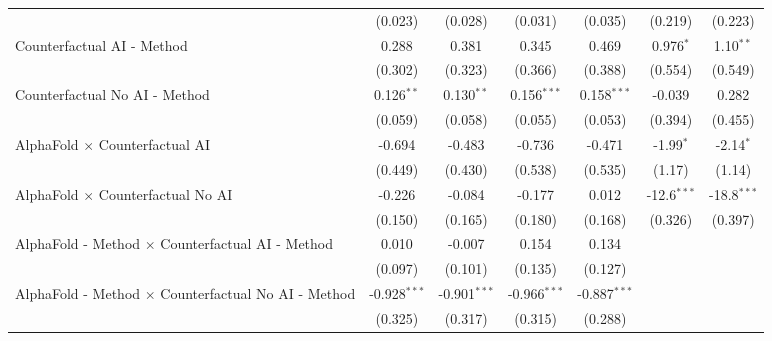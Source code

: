 \begin{tabular}{lcccccc}
                                                              & (0.023)        & (0.028)        & (0.031)        & (0.035)        & (0.219)       & (0.223)\\   
   Counterfactual AI - Method                                 & 0.288          & 0.381          & 0.345          & 0.469          & 0.976$^{*}$   & 1.10$^{**}$\\   
                                                              & (0.302)        & (0.323)        & (0.366)        & (0.388)        & (0.554)       & (0.549)\\   
   Counterfactual No AI - Method                              & 0.126$^{**}$   & 0.130$^{**}$   & 0.156$^{***}$  & 0.158$^{***}$  & -0.039        & 0.282\\   
                                                              & (0.059)        & (0.058)        & (0.055)        & (0.053)        & (0.394)       & (0.455)\\   
   AlphaFold $\times$ Counterfactual AI                       & -0.694         & -0.483         & -0.736         & -0.471         & -1.99$^{*}$   & -2.14$^{*}$\\   
                                                              & (0.449)        & (0.430)        & (0.538)        & (0.535)        & (1.17)        & (1.14)\\   
   AlphaFold $\times$ Counterfactual No AI                    & -0.226         & -0.084         & -0.177         & 0.012          & -12.6$^{***}$ & -18.8$^{***}$\\   
                                                              & (0.150)        & (0.165)        & (0.180)        & (0.168)        & (0.326)       & (0.397)\\   
   AlphaFold - Method $\times$ Counterfactual AI - Method     & 0.010          & -0.007         & 0.154          & 0.134          &               &   \\   
                                                              & (0.097)        & (0.101)        & (0.135)        & (0.127)        &               &   \\   
   AlphaFold - Method $\times$ Counterfactual No AI - Method  & -0.928$^{***}$ & -0.901$^{***}$ & -0.966$^{***}$ & -0.887$^{***}$ &               &   \\   
                                                              & (0.325)        & (0.317)        & (0.315)        & (0.288)        &               &   \\   

\end{tabular}
